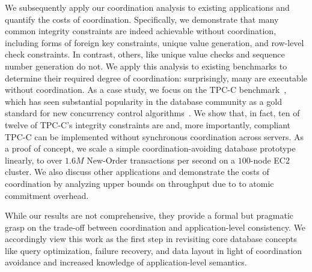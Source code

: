 
We subsequently apply our \iconfluence coordination analysis to
existing applications and quantify the costs of
coordination. Specifically, we demonstrate that many common integrity
constraints are indeed achievable without coordination, including
forms of foreign key constraints, unique value generation, and
row-level check constraints. In contrast, others, like unique value
checks and sequence number generation do not. We apply this analysis
to existing benchmarks to determine their required degree of
coordination: surprisingly, many are executable without
coordination. As a case study, we focus on the TPC-C
benchmark~\cite{tpcc}, which has seen substantial popularity in the
database community as a gold standard for new concurrency control
algorithms~\cite{abadi-vll,jones-dtxn,schism,calvin,hstore,oltpbench}. We
show that, in fact, ten of twelve of TPC-C's integrity constraints are
\iconfluent and, more importantly, compliant TPC-C can be implemented
without synchronous coordination across servers. As a proof of
concept, we scale a simple coordination-avoiding database prototype
linearly, to over $1.6M$ New-Order transactions per second on a
$100$-node EC2 cluster. We also discuss other applications and
demonstrate the costs of coordination by analyzing upper bounds on
throughput due to to atomic commitment overhead.

While our results are not comprehensive, they provide a formal but
pragmatic grasp on the trade-off between coordination and
application-level consistency. We accordingly view this work as the
first step in revisiting core database concepts like query
optimization, failure recovery, and data layout in light of
coordination avoidance and increased knowledge of application-level
semantics.



